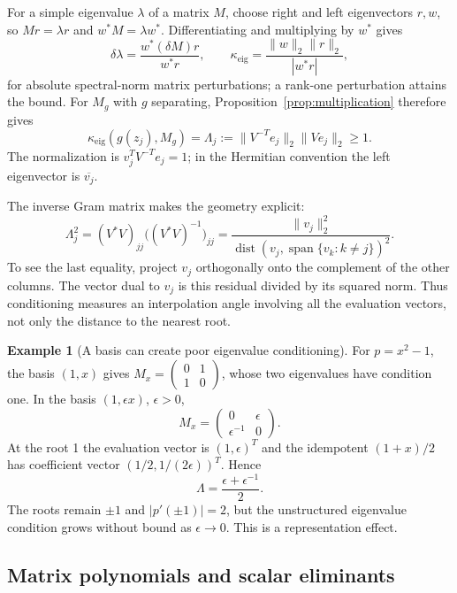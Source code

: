 \documentclass[12pt]{article}
\DeclareMathOperator{\spanop}{span}
\theoremstyle{definition}
\newtheorem{example}[theorem]{Example}
\theoremstyle{remark}
\begin{document}
For a simple eigenvalue $\lambda$ of a matrix $M$, choose right and left
eigenvectors $r,w$, so $Mr=\lambda r$ and $w^*M=\lambda w^*$. Differentiating
and multiplying by $w^*$ gives
\[
  \delta\lambda=\frac{w^*(\delta M)r}{w^*r},\qquad
  \kappa_{\mathrm{eig}}=\frac{\|w\|_2\|r\|_2}{|w^*r|},
\]
for absolute spectral-norm matrix perturbations; a rank-one perturbation attains
the bound. For $M_g$ with $g$ separating, Proposition~\ref{prop:multiplication}
therefore gives
\begin{equation}\label{eq:overlap}
  \kappa_{\mathrm{eig}}(g(z_j),M_g)
  =\Lambda_j:=\|V^{-T}e_j\|_2\|Ve_j\|_2\ge1.
\end{equation}
The normalization is $v_j^TV^{-T}e_j=1$; in the Hermitian convention the left
eigenvector is $\overline{v_j}$.

The inverse Gram matrix makes the geometry explicit:
\[
  \Lambda_j^2=(V^*V)_{jj}\bigl((V^*V)^{-1}\bigr)_{jj}
  =\frac{\|v_j\|_2^2}
  {\operatorname{dist}(v_j,\spanop\{v_k:k\ne j\})^2}.
\]
To see the last equality, project $v_j$ orthogonally onto the complement of
the other columns. The vector dual to $v_j$ is this residual divided by its
squared norm. Thus conditioning measures an interpolation angle involving all
the evaluation vectors, not only the distance to the nearest root.

\begin{example}[A basis can create poor eigenvalue conditioning]\label{ex:basis}
For $p=x^2-1$, the basis $(1,x)$ gives
$M_x=\left(\begin{smallmatrix}0&1\\1&0\end{smallmatrix}\right)$, whose two
eigenvalues have condition one. In the basis $(1,\epsilon x)$, $\epsilon>0$,
\[
  M_x=\begin{pmatrix}0&\epsilon\\\epsilon^{-1}&0\end{pmatrix}.
\]
At the root 1 the evaluation vector is $(1,\epsilon)^T$ and the idempotent
$(1+x)/2$ has coefficient vector $(1/2,1/(2\epsilon))^T$. Hence
\[
  \Lambda=\frac{\epsilon+\epsilon^{-1}}2.
\]
The roots remain $\pm1$ and $|p'(\pm1)|=2$, but the unstructured eigenvalue
condition grows without bound as $\epsilon\to0$. This is a representation effect.
\end{example}

\subsection{Matrix polynomials and scalar eliminants}
\end{document}
